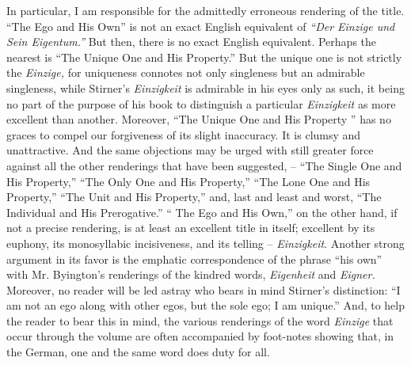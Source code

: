\documentclass[12pt,a4paper]{book}
\begin{document}
In particular, I am responsible for the admittedly erroneous rendering of the 
title. ``The Ego and His Own'' is not an exact English equivalent of 
\textit{``Der Einzige und Sein Eigentum.''} But then, there is no exact 
English equivalent. Perhaps the nearest is ``The Unique One and His 
Property.'' But the unique one is not strictly the \textit{Einzige,} for 
uniqueness connotes not only singleness but an admirable singleness, while 
Stirner's \textit{Einzigkeit} is admirable in his eyes only as such, it being 
no part of the purpose of his book to distinguish a particular 
\textit{Einzigkeit} as more excellent than another. Moreover, ``The Unique 
One and His Property '' has no graces to compel our forgiveness of its slight 
inaccuracy. It is clumsy and unattractive. And the same objections may be 
urged with still greater force against all the other renderings that have been 
suggested, -- ``The Single One and His Property,'' ``The Only One and His 
Property,'' ``The Lone One and His Property,'' ``The Unit and His 
Property,'' and, last and least and worst, ``The Individual and His 
Prerogative.'' `` The Ego and His Own,'' on the other hand, if not a 
precise rendering, is at least an excellent title in itself; excellent by its 
euphony, its monosyllabic incisiveness, and its telling -- 
\textit{Einzigkeit}. Another strong argument in its favor is the emphatic 
correspondence of the phrase ``his own'' with Mr. Byington's renderings of 
the kindred words, \textit{Eigenheit} and \textit{Eigner.} Moreover, no reader 
will be led astray who bears in mind Stirner's distinction: ``I am not an ego 
along with other egos, but the sole ego; I am unique.'' And, to help the 
reader to bear this in mind, the various renderings of the word 
\textit{Einzige} that occur through the volume are often accompanied by 
foot-notes showing that, in the German, one and the same word does duty for 
all.
\end{document}
